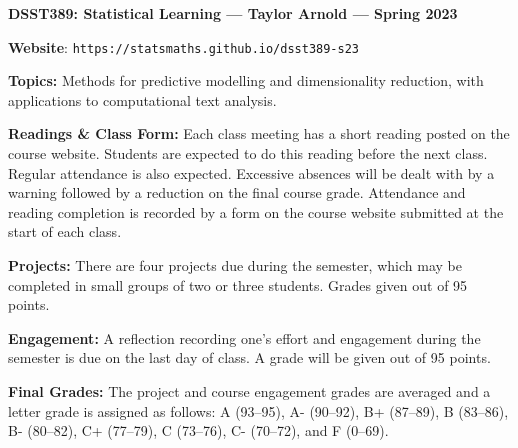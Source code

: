 \documentclass[11pt, a4paper]{article}
\begin{document}
\begin{center}
\textbf{DSST389: Statistical Learning --- Taylor Arnold --- Spring 2023}
\end{center}

\vspace{0.5cm}

\textbf{Website}: \texttt{https://statsmaths.github.io/dsst389-s23}

\bigskip

\textbf{Topics:}
Methods for predictive modelling and dimensionality reduction, with
applications to computational text analysis.

\bigskip

\textbf{Readings \& Class Form:}
Each class meeting has a short reading posted on the course website.
Students are expected to do this reading before the next class.
Regular attendance is also expected. Excessive absences will be dealt
with by a warning followed by a reduction on the final course grade.
Attendance and reading completion is recorded by a form on the course
website submitted at the start of each class.

\bigskip

\textbf{Projects:}
There are four projects due during the semester, which may be completed in
small groups of two or three students. Grades given out of 95 points.

\bigskip

\textbf{Engagement:}
A reflection recording one's effort and engagement during the semester
is due on the last day of class. A grade will be given out of 95 points.

\bigskip

\textbf{Final Grades:}
The project and course engagement grades are averaged and a letter grade
is assigned as follows:
             A (93--95), A- (90--92),
B+ (87--89), B (83--86), B- (80--82),
C+ (77--79), C (73--76), C- (70--72), and F (0--69).
\end{document}
